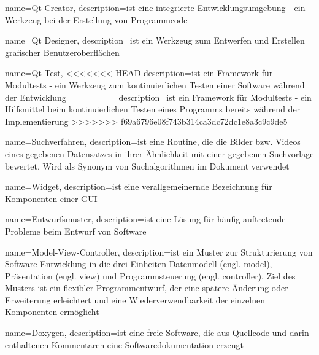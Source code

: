 {
name=Qt Creator,
description={ist eine integrierte Entwicklungsumgebung - ein Werkzeug bei der Erstellung von Programmcode}
}

{
name=Qt Designer,
description={ist ein Werkzeug zum Entwerfen und Erstellen grafischer Benutzeroberflächen}
}

{
name=Qt Test,
<<<<<<< HEAD
description={ist ein Framework für Modultests - ein Werkzeug zum kontinuierlichen Testen einer Software während der Entwicklung}
=======
description={ist ein Framework für Modultests - ein Hilfsmittel beim kontinuierlichen Testen eines Programms bereits während der Implementierung}
>>>>>>> f69a6796e08f743b314ca3dc72dc1e8a3c9c9de5
}

{
name=Suchverfahren,
description={ist eine Routine, die die Bilder bzw. Videos eines gegebenen Datensatzes in ihrer Ähnlichkeit mit einer gegebenen Suchvorlage bewertet. \newline Wird als Synonym von Suchalgorithmen im Dokument verwendet}
}

{
name=Widget,
description={ist eine verallgemeinernde Bezeichnung für Komponenten einer \gls{GUI}}
}

{
name=Entwurfsmuster,
description={ist eine Lösung für häufig auftretende Probleme beim Entwurf von Software}
}

{
name=Model-View-Controller,
description={ist ein Muster zur Strukturierung von Software-Entwicklung in die drei Einheiten Datenmodell (engl. model), Präsentation (engl. view) und Programmsteuerung (engl. controller). Ziel des Musters ist ein flexibler Programmentwurf, der eine spätere Änderung oder Erweiterung erleichtert und eine Wiederverwendbarkeit der einzelnen Komponenten ermöglicht}
}

{
name=Doxygen,
description={ist eine freie Software, die aus Quellcode und darin enthaltenen Kommentaren eine Softwaredokumentation erzeugt}
}
